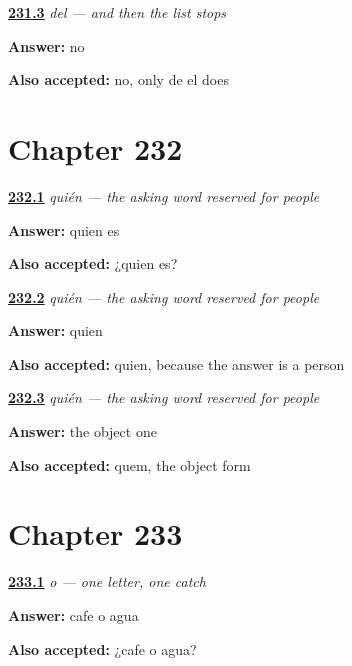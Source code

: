 \noindent\begin{minipage}[t]{\linewidth}
\raggedright
\hyperlink{review-ES-C61-del-la}{\textbf{231.3}} \emph{del — and then the list stops}\par
\small \textbf{Answer:} no\par
\footnotesize \textbf{Also accepted:} no, only de el does
\end{minipage}\par\medskip

\section*{Chapter 232}

\noindent\begin{minipage}[t]{\linewidth}
\raggedright
\hyperlink{review-ES-C61-quien-ask}{\textbf{232.1}} \emph{quién — the asking word reserved for people}\par
\small \textbf{Answer:} quien es\par
\footnotesize \textbf{Also accepted:} ¿quien es?
\end{minipage}\par\medskip

\noindent\begin{minipage}[t]{\linewidth}
\raggedright
\hyperlink{review-ES-C61-quien-which}{\textbf{232.2}} \emph{quién — the asking word reserved for people}\par
\small \textbf{Answer:} quien\par
\footnotesize \textbf{Also accepted:} quien, because the answer is a person
\end{minipage}\par\medskip

\noindent\begin{minipage}[t]{\linewidth}
\raggedright
\hyperlink{review-ES-C61-quien-latin}{\textbf{232.3}} \emph{quién — the asking word reserved for people}\par
\small \textbf{Answer:} the object one\par
\footnotesize \textbf{Also accepted:} quem, the object form
\end{minipage}\par\medskip

\section*{Chapter 233}

\noindent\begin{minipage}[t]{\linewidth}
\raggedright
\hyperlink{review-ES-C61-o-ask}{\textbf{233.1}} \emph{o — one letter, one catch}\par
\small \textbf{Answer:} cafe o agua\par
\footnotesize \textbf{Also accepted:} ¿cafe o agua?
\end{minipage}\par\medskip

